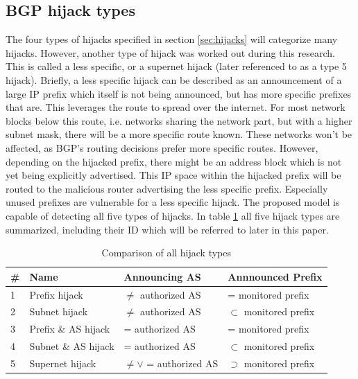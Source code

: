 \subsection{BGP hijack types}\label{subsec:modelbgphijacktypes}
The four types of hijacks specified in section \ref{sec:hijacks} will categorize many hijacks. However, another type of hijack was worked out during this research. This is called a less specific, or a supernet hijack (later referenced to as a type 5 hijack). Briefly, a less specific hijack can be described as an announcement of a large IP prefix which itself is not being announced, but has more specific prefixes that are. This leverages the route to spread over the internet. For most network blocks below this route, i.e. networks sharing the network part, but with a higher subnet mask, there will be a more specific route known. These networks won't be affected, as BGP's routing decisions prefer more specific routes\cite{rekhter2006rfc}. However, depending on the hijacked prefix, there might be an address block which is not yet being explicitly advertised. This IP space within the hijacked prefix will be routed to the malicious router advertising the less specific prefix. Especially unused prefixes are vulnerable for a less specific hijack. The proposed model is capable of detecting all five types of hijacks. In table \ref{table:hijacktypes} all five hijack types are summarized, including their ID which will be referred to later in this paper.\par

\begin{table}[h]
        \centering
        \begin{tabular}{p{0.5cm}|p{4cm}|p{4cm}|p{4cm}|}
                \textbf{\#} & \textbf{Name} & \textbf{Announcing AS} & \textbf{Annnounced Prefix} \\ \hline
                1 & Prefix hijack\cite{hu2007accurate} & $\neq$ authorized AS & = monitored prefix \\ \hline
                2 & Subnet hijack\cite{hu2007accurate} & $\neq$ authorized AS & $\subset$ monitored prefix \\ \hline
                3 & Prefix \& AS hijack\cite{hu2007accurate} & = authorized AS & = monitored prefix \\ \hline
                4 & Subnet \& AS hijack\cite{hu2007accurate} & = authorized AS & $\subset$ monitored prefix \\ \hline
                5 & Supernet hijack & $\neq \lor$ = authorized AS & $\supset$ monitored prefix \\ \hline
        \end{tabular}
        \caption{Comparison of all hijack types}
        \label{table:hijacktypes}
\end{table}

